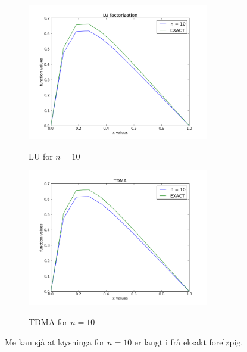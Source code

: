 \documentclass[11pt, a4paper]{article}
\begin{document}
    \begin{figure}[H]
      \centering
      \includegraphics[width=300px]{LU10.png} \\
      \caption{LU for $n = 10$}
    \end{figure}
    \begin{figure}
      \centering
      \includegraphics[width=300px]{TDMA10.png} \\
      \caption{TDMA for $n = 10$}
    \end{figure}

    Me kan sjå at løysninga for $n = 10$ er langt i frå eksakt foreløpig.
\end{document}

